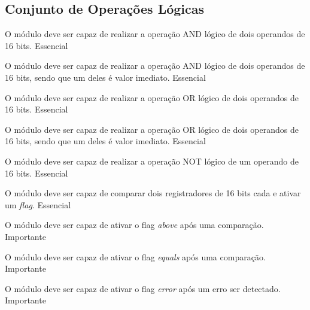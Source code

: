 \subsection{Conjunto de Operações Lógicas} 
  
    \begin{functional}
    
      {O módulo deve ser capaz de realizar a operação AND lógico de dois operandos de 16 bits.}
      {Essencial}
      
      {O módulo deve ser capaz de realizar a operação AND lógico de dois operandos de 16 bits, sendo que um deles é valor imediato.}
      {Essencial}

      {O módulo deve ser capaz de realizar a operação OR lógico de dois operandos de 16 bits.}
      {Essencial}  
      
      {O módulo deve ser capaz de realizar a operação OR lógico de dois operandos de 16 bits, sendo que um deles é valor imediato.}
      {Essencial} 
      
      {O módulo deve ser capaz de realizar a operação NOT lógico de um operando de 16 bits.}
      {Essencial}   
      
      {O módulo deve ser capaz de comparar dois registradores de 16 bits cada e ativar um \textit{flag}.}
      {Essencial}
      
      {O módulo deve ser capaz de ativar o flag \textit{above} após uma comparação.}
      {Importante}
      
      {O módulo deve ser capaz de ativar o flag \textit{equals} após uma comparação.}
      {Importante}
      
      {O módulo deve ser capaz de ativar o flag \textit{error} após um erro ser detectado.}
      {Importante}
      
    \end{functional}